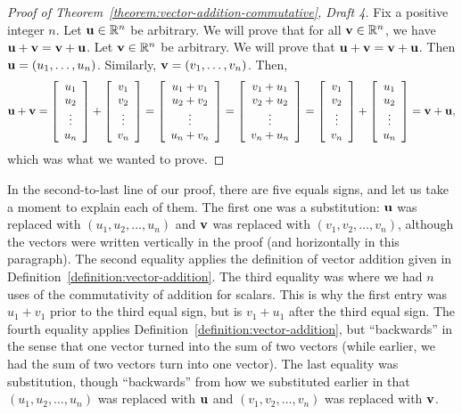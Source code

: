\documentclass{book}
\theoremstyle{ekimcustom}
\begin{document}
\begin{proof}[Proof of Theorem~\ref{theorem:vector-addition-commutative}, Draft 4]
Fix a positive integer $n$. Let ${\bf u} \in \mathbb{R}^n$ be arbitrary. We will prove that for all ${\bf v} \in \mathbb{R}^n$, we have ${\bf u}+{\bf v} = {\bf v} + {\bf u}$. Let ${\bf v} \in \mathbb{R}^n$ be arbitrary. We will prove that ${\bf u}+{\bf v} = {\bf v} + {\bf u}$. Then ${\bf u} = (u_1,\dots,u_n)$. Similarly, ${\bf v} = (v_1,\dots,v_n)$. Then,
\[ {\bf u} + {\bf v}
= 
\left[ \begin{array}{c}u_1\\u_2\\\vdots\\u_n\end{array} \right]
+
\left[ \begin{array}{c}v_1\\v_2\\\vdots\\v_n\end{array} \right]
=
\left[ \begin{array}{c}u_1+v_1\\u_2+v_2\\\vdots\\u_n+v_n\end{array} \right]
=
\left[ \begin{array}{c}v_1+u_1\\v_2+u_2\\\vdots\\v_n+u_n\end{array} \right]
=
\left[ \begin{array}{c}v_1\\v_2\\\vdots\\v_n\end{array} \right]
+
\left[ \begin{array}{c}u_1\\u_2\\\vdots\\u_n\end{array} \right]
=
{\bf v} + {\bf u},\]
which was what we wanted to prove.
\end{proof}
In the second-to-last line of our proof, there are five equals signs, and let us take a moment to explain each of them. The first one was a substitution: ${\bf u}$ was replaced with $(u_1,u_2,\dots,u_n)$ and ${\bf v}$ was replaced with $(v_1,v_2,\dots,v_n)$, although the vectors were written vertically in the proof (and horizontally in this paragraph). The second equality applies the definition of vector addition given in Definition~\ref{definition:vector-addition}. The third equality was where we had $n$ uses of the commutativity of addition for scalars. This is why the first entry was $u_1+v_1$ prior to the third equal sign, but is $v_1+u_1$ after the third equal sign. The fourth equality applies Definition~\ref{definition:vector-addition}, but ``backwards'' in the sense that one vector turned into the sum of two vectors (while earlier, we had the sum of two vectors turn into one vector). The last equality was substitution, though ``backwards'' from how we substituted earlier in that $(u_1,u_2,\dots,u_n)$ was replaced with ${\bf u}$ and $(v_1,v_2,\dots,v_n)$ was replaced with ${\bf v}$.
\end{document}
